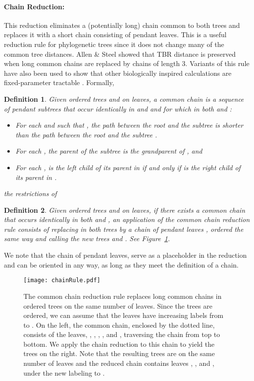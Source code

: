 \documentclass[12pt]{article}
\newtheorem{definition}{Definition}
\begin{document}
\paragraph{Chain Reduction:}  
This reduction eliminates a (potentially long) chain common to both trees and replaces it with
a short chain consisting of  pendant leaves.
This is a  useful reduction rule for phylogenetic trees since 
it does not change many of the common tree distances.
Allen \& Steel \cite{allenSteel} showed that
TBR  distance is preserved when long common chains
are replaced by chains of length 3.  Variants of this
rule have also been used to show that other biologically inspired
calculations are fixed-parameter tractable \cite{uSPRfpt,bordewichSemple,Bordewich2007}.
Formally, 
\begin{definition}
Given ordered trees  and  on 
leaves, a {\em common chain}   is a sequence of pendant subtrees that occur 
identically in  and  and for which  in both  and :
\begin{itemize}
\itemsep 0pt
	\item For each  and  such that , 
		the path between the root and the subtree  is shorter
		than the path between the root and the subtree .
	\item For each , the parent of the subtree  is 
		the grandparent of , and
	\item For each ,  is the left child of its parent in 
		if and only if   is the right child of its parent in .
\end{itemize}
the restrictions of 
\end{definition}
\begin{definition}
Given ordered trees  and  on 
leaves, if 
there exists a common chain  that occurs identically in both 
and , an application of the {\em common chain reduction rule} consists of replacing 
 in both trees by a chain of pendant leaves , ordered the same way and 
calling the new trees  and .   
See Figure~\ref{chainRuleFigure}.
\end{definition}

We note that the chain of pendant leaves,  serve as a placeholder in the 
reduction and can be oriented in any way, as long as they meet the definition of
a chain.

\begin{figure}
\begin{center}
\texttt{[image: chainRule.pdf]}
\end{center}
\caption{\small The common chain reduction rule replaces long common chains in ordered trees on 
the same number of leaves.  Since the trees are ordered, we can assume that the leaves have
increasing labels from  to .  On the left, the common chain, enclosed by the dotted line, 
consists of the leaves, , , , , and , traversing the chain from top to bottom.
We apply the chain reduction to this chain to yield the trees on the right.  Note that the resulting
trees are on the same number of leaves and the reduced chain contains leaves , , and
, under the new labeling   to . }
\label{chainRuleFigure}

\end{figure}
\end{document}
